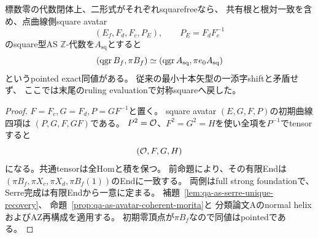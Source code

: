 \begin{corollary}
\label{cor:qa-symmetric-square-field-pointing}
標数零の代数閉体上、二形式がそれぞれsquarefreeなら、
共有根と根対一致を含め、点曲線側square avatar
\[
 (E_f,F_d,F_c,P_E),\qquad P_E=F_dF_c^{-1}
\]
のsquare型AS $\mathbb Z$-代数を$A_{\mathrm{sq}}$とすると
\[
 (\operatorname{qgr} B_f,\pi B_f)\simeq(\operatorname{qgr} A_{\mathrm{sq}},\pi e_0A_{\mathrm{sq}})
\]
というpointed exact同値がある。
従来の最小十本矢型の一添字shiftと矛盾せず、
ここでは末尾のruling evaluationで対称squareへ戻した。
\end{corollary}
\begin{proof}
$F=F_c,G=F_d,P=GF^{-1}$と置く。
square avatar $(E,G,F,P)$の初期曲線四項は
$(P,G,F,GF)$である。
$P^2=\mathcal O$、$F^2=G^2=H$を使い全項を$P^{-1}$でtensorすると
\[
 (\mathcal O,F,G,H)
\]
になる。共通tensorは全Homと積を保つ。
前命題により、その有限Endは
$(\pi B_f,\pi X_c,\pi X_d,\pi B_f(1))$のEndに一致する。
両側はfull strong foundationで、Serre完成は有限Endから一意に定まる。
補題~\ref{lem:qa-as-serre-unique-recovery}、
命題~\ref{prop:qa-as-avatar-coherent-morita}と
分類論文Aのnormal helixおよびAZ再構成を適用する。
初期零頂点が$\pi B_f$なので同値はpointedである。
\end{proof}


